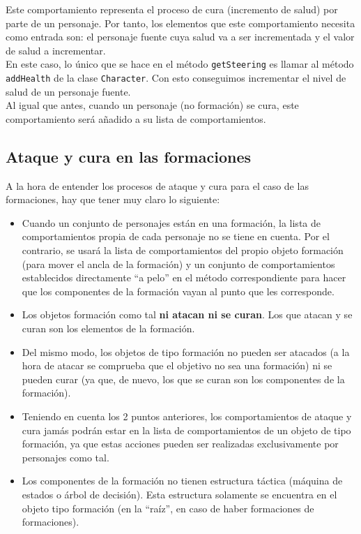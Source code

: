 Este comportamiento representa el proceso de cura (incremento de salud) por parte de un personaje. Por tanto, los elementos que este comportamiento necesita como entrada son: el personaje fuente cuya salud va a ser incrementada y el valor de salud a incrementar. \\

En este caso, lo único que se hace en el método \texttt{getSteering} es llamar al método \texttt{addHealth} de la clase \texttt{Character}. Con esto conseguimos incrementar el nivel de salud de un personaje fuente. \\

Al igual que antes, cuando un personaje (no formación) se cura, este comportamiento será añadido a su lista de comportamientos.

\subsection{Ataque y cura en las formaciones}

A la hora de entender los procesos de ataque y cura para el caso de las formaciones, hay que tener muy claro lo siguiente:
\begin{itemize}
	\item Cuando un conjunto de personajes están en una formación, la lista de comportamientos propia de cada personaje no se tiene en cuenta. Por el contrario, se usará la lista de comportamientos del propio objeto formación (para mover el ancla de la formación) y un conjunto de comportamientos establecidos directamente ``a pelo'' en el método correspondiente para hacer que los componentes de la formación vayan al punto que les corresponde.
	\item Los objetos formación como tal \textbf{ni atacan ni se curan}. Los que atacan y se curan son los elementos de la formación.
	\item Del mismo modo, los objetos de tipo formación no pueden ser atacados (a la hora de atacar se comprueba que el objetivo no sea una formación) ni se pueden curar (ya que, de nuevo, los que se curan son los componentes de la formación).
	\item Teniendo en cuenta los 2 puntos anteriores, los comportamientos de ataque y cura jamás podrán estar en la lista de comportamientos de un objeto de tipo formación, ya que estas acciones pueden ser realizadas exclusivamente por personajes como tal.
	\item Los componentes de la formación no tienen estructura táctica (máquina de estados o árbol de decisión). Esta estructura solamente se encuentra en el objeto tipo formación (en la ``raíz'', en caso de haber formaciones de formaciones).
\end{itemize}

